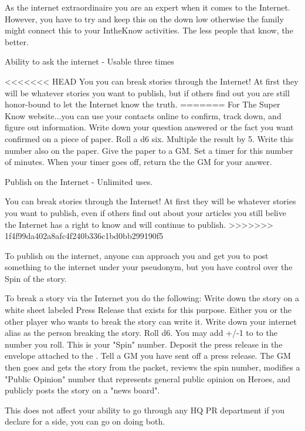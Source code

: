 \documentclass[green]{LRSguildcamp1}
\begin{document}
\name{\gInternetPR{}}

As \cTween{} the internet extraordinaire you are an expert when it comes to the Internet. However, you have to try and keep this on the down low otherwise the family might connect this to your IntheKnow activities. The less people that know, the better. 

Ability to ask the internet - Usable three times

<<<<<<< HEAD
You you can break stories through the Internet! At first they will be whatever stories you want to publish, but if others find out you are still honor-bound to let the Internet know the truth. 
=======
For The Super Know website...you can use your contacts online to confirm, track down, and figure out information. Write down your question answered or the fact you want confirmed on a piece of paper. Roll a d6 six. Multiple the result by 5. Write this number also on the paper. Give the paper to a GM. Set a timer for this number of minutes. When your timer goes off, return the the GM for your answer. 

Publish on the Internet - Unlimited uses.

You can break stories through the Internet! At first they will be whatever stories you want to publish, even if others find out about your articles you still belive the Internet has a right to know and will continue to publish. 
>>>>>>> 1f4f99da402a8afc4f240b336c1bd0bb299190f5

To publish on the internet, anyone can approach you and get you to post something to the internet under your pseudonym, but you have control over the Spin of the story. 

To break a story via the Internet you do the following:
Write down the story on a white sheet labeled Press Release that exists for this purpose. Either you or the other player who wants to break the story can write it. 
Write down your internet alias as the person breaking the story.  
Roll d6.  You may add +/-1 to to the number you roll. This is your "Spin" number.
Deposit the press release in the envelope attached to the \sComputer{}. 
Tell a GM you have sent off a press release.
The GM then goes and gets the story from the packet, reviews the spin number, modifies a "Public Opinion" number that represents general public opinion on Heroes, and publicly posts the story on a "news board". 

This does not affect your ability to go through any HQ PR department if you declare for a side, you can go on doing both. 
\end{document}
